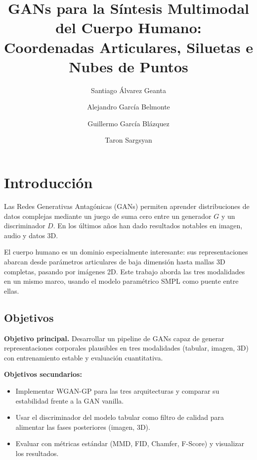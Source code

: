 \documentclass[11pt,a4paper,twocolumn]{article}
\title{GANs para la Síntesis Multimodal del Cuerpo Humano:\\
Coordenadas Articulares, Siluetas e Nubes de Puntos}
\author[1]{Santiago Álvarez Geanta}
\author[1]{Alejandro García Belmonte}
\author[1]{Guillermo García Blázquez}
\author[1]{Taron Sargsyan}
\affil[1]{Universidad de Alicante, Grado en Ingeniería en Inteligencia Artificial}
\date{}
\begin{document}

\section{Introducción}

Las Redes Generativas Antagónicas (GANs) \cite{goodfellow2014} permiten aprender
distribuciones de datos complejas mediante un juego de suma cero entre un
generador $G$ y un discriminador $D$. En los últimos años han dado resultados
notables en imagen, audio y datos 3D.

El cuerpo humano es un dominio especialmente interesante: sus representaciones
abarcan desde parámetros articulares de baja dimensión hasta mallas 3D
completas, pasando por imágenes 2D. Este trabajo aborda las tres modalidades
en un mismo marco, usando el modelo paramétrico SMPL \cite{loper2015smpl}
como puente entre ellas.

\subsection{Objetivos}

\textbf{Objetivo principal.} Desarrollar un pipeline de GANs capaz de generar
representaciones corporales plausibles en tres modalidades (tabular, imagen,
3D) con entrenamiento estable y evaluación cuantitativa.

\textbf{Objetivos secundarios:}
\begin{itemize}
  \item Implementar WGAN-GP \cite{gulrajani2017wgangp} para las tres
    arquitecturas y comparar su estabilidad frente a la GAN vanilla.
  \item Usar el discriminador del modelo tabular como filtro de calidad para
    alimentar las fases posteriores (imagen, 3D).
  \item Evaluar con métricas estándar (MMD, FID, Chamfer, F-Score) y
    visualizar los resultados.
\end{itemize}
\end{document}
